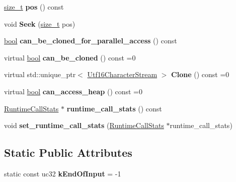 \begin{DoxyCompactItemize}
\mbox{\hyperlink{classsize__t}{size\+\_\+t}} {\bfseries pos} () const
\item 
\mbox{\label{classv8_1_1internal_1_1Utf16CharacterStream_a7a5e01f4d7c6b861c0d35f2bf825f805}} 
void {\bfseries Seek} (\mbox{\hyperlink{classsize__t}{size\+\_\+t}} pos)
\item 
\mbox{\label{classv8_1_1internal_1_1Utf16CharacterStream_a07efbd9ed6810be10b259a1c9a07ba14}} 
\mbox{\hyperlink{classbool}{bool}} {\bfseries can\+\_\+be\+\_\+cloned\+\_\+for\+\_\+parallel\+\_\+access} () const
\item 
\mbox{\label{classv8_1_1internal_1_1Utf16CharacterStream_aabcaf289ce352d1af55c0204647b7dd9}} 
virtual \mbox{\hyperlink{classbool}{bool}} {\bfseries can\+\_\+be\+\_\+cloned} () const =0
\item 
\mbox{\label{classv8_1_1internal_1_1Utf16CharacterStream_aa1b52c43e22f2f2ff1923169a780850b}} 
virtual std\+::unique\+\_\+ptr$<$ \mbox{\hyperlink{classv8_1_1internal_1_1Utf16CharacterStream}{Utf16\+Character\+Stream}} $>$ {\bfseries Clone} () const =0
\item 
\mbox{\label{classv8_1_1internal_1_1Utf16CharacterStream_ad117217db7d8df9719d79b3cc5aa4aa8}} 
virtual \mbox{\hyperlink{classbool}{bool}} {\bfseries can\+\_\+access\+\_\+heap} () const =0
\item 
\mbox{\label{classv8_1_1internal_1_1Utf16CharacterStream_a62781098d4df487da7dd94582f5617d1}} 
\mbox{\hyperlink{classv8_1_1internal_1_1RuntimeCallStats}{Runtime\+Call\+Stats}} $\ast$ {\bfseries runtime\+\_\+call\+\_\+stats} () const
\item 
\mbox{\label{classv8_1_1internal_1_1Utf16CharacterStream_a9e91463788ada53b2de96ec6f3a7e358}} 
void {\bfseries set\+\_\+runtime\+\_\+call\+\_\+stats} (\mbox{\hyperlink{classv8_1_1internal_1_1RuntimeCallStats}{Runtime\+Call\+Stats}} $\ast$runtime\+\_\+call\+\_\+stats)
\end{DoxyCompactItemize}
\subsection*{Static Public Attributes}
\begin{DoxyCompactItemize}
\item 
\mbox{\label{classv8_1_1internal_1_1Utf16CharacterStream_ab9485ef6f823b9629ad87a3070f9448a}} 
static const uc32 {\bfseries k\+End\+Of\+Input} = -\/1
\end{DoxyCompactItemize}
